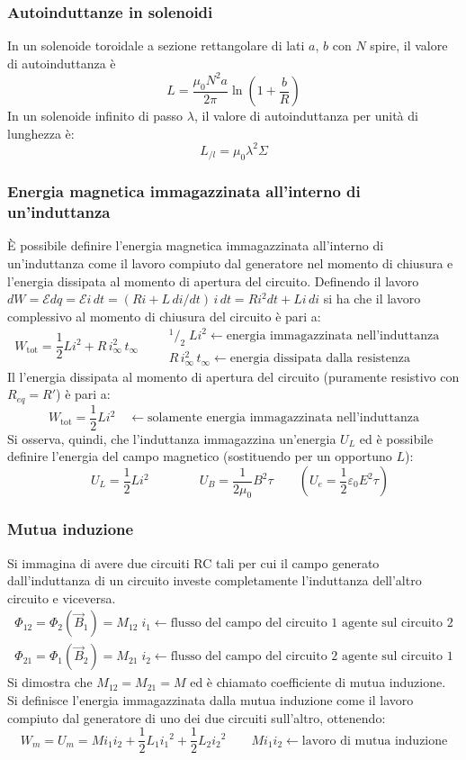 \documentclass[a4paper]{article}
\begin{document}
\subsubsection*{Autoinduttanze in solenoidi}
In un solenoide toroidale a sezione rettangolare di lati \(a\), \(b\) con \(N\) spire, il valore di autoinduttanza è
\[L = \frac{\mu_0 N^2 a}{2 \pi} \ln \left( 1+ \frac{b}{R} \right)\]
In un solenoide infinito di passo \(\lambda\), il valore di autoinduttanza per unità di lunghezza è:
\[L_{/l} = \mu_0 \lambda^2 \Sigma\]

\subsubsection*{Energia magnetica immagazzinata all'interno di un'induttanza}
È possibile definire l'energia magnetica immagazzinata all'interno di un'induttanza come il lavoro compiuto dal generatore nel
momento di chiusura e l'energia dissipata al momento di apertura del circuito.
Definendo il lavoro \(dW = \mathcal{E} dq = \mathcal{E} i \, dt = (R i + L \, di / dt) \, i \, dt = R i^2 dt + L i \, di\) si ha
che il lavoro complessivo al momento di chiusura del circuito è pari a:
\[W_\text{tot} = \frac{1}{2} Li^2 + R \, i_\infty^2 \, t_\infty \qquad \begin{matrix}
	^1\!/_2 \; Li^2 \leftarrow \text{energia immagazzinata nell'induttanza}\\[5pt]
	R \, i_\infty^2 \, t_\infty \leftarrow \text{energia dissipata dalla resistenza} \qquad\quad
\end{matrix}\]
Il l'energia dissipata al momento di apertura del circuito (puramente resistivo con \(R_{eq} = R'\)) è pari a:
\[W_\text{tot} = \frac{1}{2} Li^2 \quad \leftarrow \text{solamente energia immagazzinata nell'induttanza}\]
Si osserva, quindi, che l'induttanza immagazzina un'energia \(U_L\) ed è possibile definire l'energia del campo magnetico
(sostituendo per un opportuno \(L\)):
\[ \quad U_L = \frac{1}{2} Li^2 \qquad\qquad U_B = \frac{1}{2\mu_0} B^2 \tau \qquad \left(U_e = \frac{1}{2}\varepsilon_0 E^2 \tau\right)\]

\subsubsection*{Mutua induzione}
Si immagina di avere due circuiti RC tali per cui il campo generato dall'induttanza di un circuito investe completamente
l'induttanza dell'altro circuito e viceversa.
\[\begin{matrix}
	\Phi_{12} = \Phi_2(\vec{B}_1) = M_{12} \; i_1 \leftarrow \text{flusso del campo del circuito 1 agente sul circuito 2} \\
	\Phi_{21} = \Phi_1(\vec{B}_2) = M_{21} \; i_2 \leftarrow \text{flusso del campo del circuito 2 agente sul circuito 1}
\end{matrix}\]
Si dimostra che \(M_{12} = M_{21} = M\) ed è chiamato coefficiente di mutua induzione.\\
Si definisce l'energia immagazzinata dalla mutua induzione come il lavoro compiuto dal generatore di uno dei due circuiti
sull'altro, ottenendo:
\[W_m = U_m = M i_1 i_2 + \frac{1}{2} L_1 {i_1}^2 + \frac{1}{2} L_2 {i_2}^2 \qquad M i_1 i_2 \leftarrow \text{lavoro di mutua induzione} \]
\end{document}
